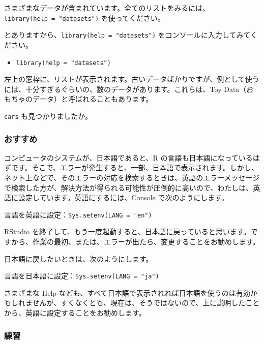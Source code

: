 \documentclass[
]{bxjsbook}
\providecommand{\tightlist}{%
  \setlength{\itemsep}{0pt}\setlength{\parskip}{0pt}}
\theoremstyle{definition}
\theoremstyle{definition}
\theoremstyle{definition}
\theoremstyle{definition}
\theoremstyle{remark}
\begin{document}
さまざまなデータが含まれています。全てのリストをみるには、\texttt{library(help\ =\ "datasets")} を使ってください。

とありますから、\texttt{library(help\ =\ "datasets")} をコンソールに入力してみてください。

\begin{itemize}
\tightlist
\item
  \texttt{library(help\ =\ "datasets")}
\end{itemize}

左上の窓枠に、リストが表示されます。古いデータばかりですが、例として使うには、十分すぎるぐらいの、数のデータがあります。これらは、Toy Data（おもちゃのデータ）と呼ばれることもあります。

\texttt{cars} も見つかりましたか。

\hypertarget{ux304aux3059ux3059ux3081}{%
\subsubsection{おすすめ}\label{ux304aux3059ux3059ux3081}}

コンピュータのシステムが、日本語であると、R の言語も日本語になっているはずです。そこで、エラーが発生すると、一部、日本語で表示されます。しかし、ネット上などで、そのエラーの対応を検索するときは、英語のエラーメッセージで検索した方が、解決方法が得られる可能性が圧倒的に高いので、わたしは、英語に設定しています。英語にするには、Console で次のようにします。

言語を英語に設定：\texttt{Sys.setenv(LANG\ =\ "en")}

RStudio を終了して、もう一度起動すると、日本語に戻っていると思います。ですから、作業の最初、または、エラーが出たら、変更することをお勧めします。

日本語に戻したいときは、次のようにします。

言語を日本語に設定：\texttt{Sys.setenv(LANG\ =\ "ja")}

さまざまな Help なども、すべて日本語で表示されれば日本語を使うのは有効かもしれませんが、すくなくとも、現在は、そうではないので、上に説明したことから、英語に設定することをお勧めします。

\hypertarget{ux7df4ux7fd2}{%
\subsubsection{練習}\label{ux7df4ux7fd2}}
\end{document}
